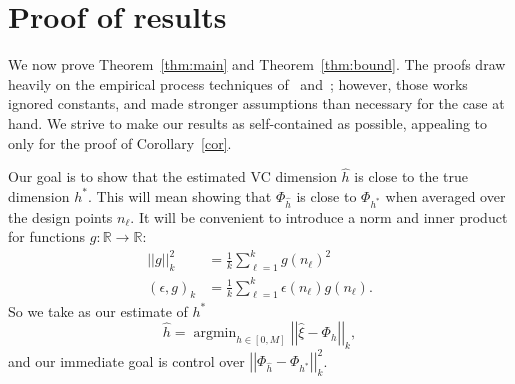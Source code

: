 \documentclass[11pt]{article}
\newcommand{\R}{\mathbb{R}}
\DeclareMathOperator*{\argmin}{argmin}
\newcommand{\vnorm}[1]{\left|\left| #1 \right|\right|}
\renewcommand{\hat}[1]{\widehat{#1}}
\begin{document}
\section{Proof of results}
\label{sec:proof-results}

We now prove Theorem~\ref{thm:main} and Theorem~\ref{thm:bound}. The proofs
draw heavily on the empirical process techniques of~\citet{Geer1990}
and~\citet{Geer2000}; however, those works ignored constants, and made stronger
assumptions than necessary for the case at hand.  We strive to make our results
as self-contained as possible, appealing to~\citep{Geer2000} only for the proof
of Corollary~\ref{cor}.

Our goal is to show that the estimated VC dimension $\hat{h}$ is close to the
true dimension $h^*$.  This will mean showing that $\Phi_{\widehat{h}}$ is close
to $\Phi_{h^*}$ when averaged over the design points $n_{\ell}$.  It will
be convenient to introduce a norm and inner product for functions
$g:\R\rightarrow\R$:
\begin{align*}
  \label{eq:13a}
  \vnorm{g}_k^2 &= \frac{1}{k}\sum_{\ell=1}^k{g(n_\ell)^2}\\
  (\epsilon,g)_k &= \frac{1}{k}\sum_{\ell=1}^k{\epsilon(n_\ell) g(n_\ell)}.
\end{align*}
So we take as our estimate of $h^*$
\begin{equation*}
  \label{eq:10}
  \widehat{h} = \argmin_{h \in [0,M]}{ \vnorm{
  \widehat{\xi} - \Phi_h}_k},
\end{equation*}
and our immediate goal is control over $\vnorm{\Phi_{\widehat{h}} -
  \Phi_{h^*}}^2_k$.
\end{document}

